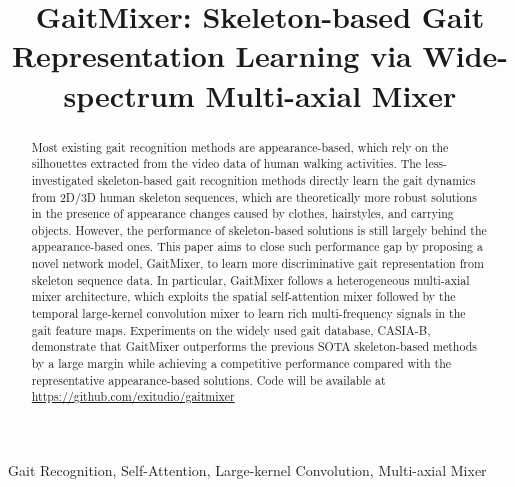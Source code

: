 \documentclass{article}
\title{GaitMixer: Skeleton-based Gait Representation Learning via Wide-spectrum Multi-axial Mixer}
\begin{document}
\maketitle
\begin{abstract}
Most existing gait recognition methods are appearance-based, which rely on the silhouettes extracted from the video data of human walking activities. The less-investigated skeleton-based gait recognition methods directly learn the gait dynamics from  2D/3D human skeleton sequences, which are theoretically more robust solutions in the presence of appearance changes caused by clothes, hairstyles, and carrying objects. However, the performance of skeleton-based solutions is still largely behind the appearance-based ones. This paper aims to close such performance gap by proposing a novel network model, GaitMixer, to learn more discriminative gait representation from skeleton sequence data. In particular, GaitMixer follows a heterogeneous multi-axial mixer architecture, which exploits the spatial self-attention mixer followed by the temporal large-kernel convolution mixer to learn rich multi-frequency signals in the gait feature maps.  Experiments on the widely used gait database, CASIA-B, demonstrate that GaitMixer outperforms the previous SOTA skeleton-based methods by a large margin while achieving a competitive performance compared with the representative appearance-based solutions.  Code will be available at \url{https://github.com/exitudio/gaitmixer}









\end{abstract}
\begin{keywords}
Gait Recognition, Self-Attention, Large-kernel Convolution, Multi-axial Mixer 
\end{keywords}
\end{document}
